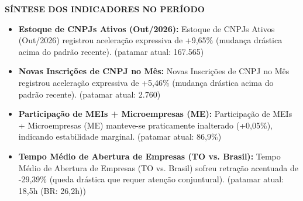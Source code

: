 \documentclass[10pt,a4paper]{article}
\begin{document}
{\hfill%
%
}


\vspace{0.10cm}

\par\vspace{0.05cm}
\par\vspace{4pt}
{\fontsize{7.8}{9.4}\selectfont\bfseries\color{corprimaria}\MakeUppercase{Síntese dos Indicadores no Período}}\par\vspace{2pt}
{\scriptsize\color{cinzatexto}
\begin{itemize}[leftmargin=10pt, itemsep=1.2pt, topsep=1pt, parsep=0pt]
   \item \textbf{\color{corprimaria}Estoque de CNPJs Ativos (Out/2026):} Estoque de CNPJs Ativos (Out/2026) registrou aceleração expressiva de +9,65\% (mudança drástica acima do padrão recente). (patamar atual: 167.565)
   \item \textbf{\color{corprimaria}Novas Inscrições de CNPJ no Mês:} Novas Inscrições de CNPJ no Mês registrou aceleração expressiva de +5,46\% (mudança drástica acima do padrão recente). (patamar atual: 2.760)
   \item \textbf{\color{corprimaria}Participação de MEIs + Microempresas (ME):} Participação de MEIs + Microempresas (ME) manteve-se praticamente inalterado (+0,05\%), indicando estabilidade marginal. (patamar atual: 86,9\%)
   \item \textbf{\color{corprimaria}Tempo Médio de Abertura de Empresas (TO vs. Brasil):} Tempo Médio de Abertura de Empresas (TO vs. Brasil) sofreu retração acentuada de -29,39\% (queda drástica que requer atenção conjuntural). (patamar atual: 18,5h (BR: 26,2h))
\end{itemize}
}
\par\vspace{0.05cm}
\end{document}

